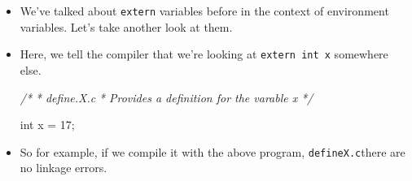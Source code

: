 \documentclass[]{article}
\newenvironment{Shaded}{}{}
\newcommand{\KeywordTok}[1]{\textcolor[rgb]{0.00,0.44,0.13}{\textbf{#1}}}
\newcommand{\DataTypeTok}[1]{\textcolor[rgb]{0.56,0.13,0.00}{#1}}
\newcommand{\DecValTok}[1]{\textcolor[rgb]{0.25,0.63,0.44}{#1}}
\newcommand{\SpecialCharTok}[1]{\textcolor[rgb]{0.25,0.44,0.63}{#1}}
\newcommand{\StringTok}[1]{\textcolor[rgb]{0.25,0.44,0.63}{#1}}
\newcommand{\ImportTok}[1]{#1}
\newcommand{\CommentTok}[1]{\textcolor[rgb]{0.38,0.63,0.69}{\textit{#1}}}
\newcommand{\PreprocessorTok}[1]{\textcolor[rgb]{0.74,0.48,0.00}{#1}}
\newcommand{\NormalTok}[1]{#1}
\begin{document}
\begin{itemize}
\item
  We've talked about \texttt{extern} variables before in the context of
  environment variables. Let's take another look at them.

\begin{Shaded}
\end{Shaded}
\item
  Here, we tell the compiler that we're looking at
  \texttt{extern\ int\ x} somewhere else.

\begin{Shaded}
\begin{Highlighting}[]
\CommentTok{/*}
\CommentTok{ * define.X.c}
\CommentTok{ * Provides a definition for the varable x}
\CommentTok{ */}

\DataTypeTok{int}\NormalTok{ x = }\DecValTok{17}\NormalTok{;}
\end{Highlighting}
\end{Shaded}
\item
  So for example, if we compile it with the above program,
  \texttt{defineX.c}there are no linkage errors.

\begin{Shaded}
\end{Shaded}
\end{itemize}
\end{document}
